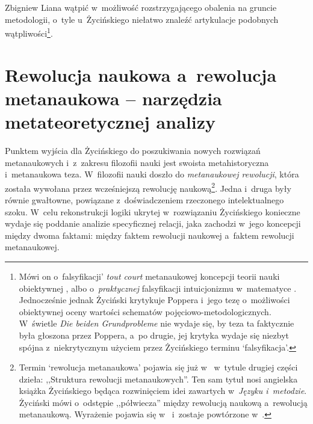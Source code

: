 \begin{artplenv}{Zbigniew Liana}
wątpić w~możliwość rozstrzygającego obalenia na gruncie metodologii, o~tyle u~Życińskiego niełatwo znaleźć artykulacje
podobnych wątpliwości\footnote{\label{lia-foo-12}Mówi on o~falsyfikacji' \textit{tout court} metanaukowej koncepcji teorii nauki
obiektywnej
\parencites[s.~9]{zycinski_structure_1988}[s.~17]{zycinski_struktura_2013},
albo o~\textit{praktycznej} falsyfikacji
intuicjonizmu w~matematyce
\parencites[s.~97]{zycinski_structure_1988}[s.~174]{zycinski_struktura_2013}.
Jednocześnie jednak Życiński
\parencites*[s.~140]{zycinski_structure_1988}[s.~248]{zycinski_struktura_2013}
krytykuje Poppera i~jego tezę o~możliwości obiektywnej
oceny wartości schematów pojęciowo-metodologicznych. W~świetle \textit{Die beiden Grundprobleme} nie wydaje się, by teza
ta faktycznie była głoszona przez Poppera, a~po drugie, jej krytyka wydaje się niezbyt spójna z~niekrytycznym użyciem
przez Życińskiego terminu `falsyfikacja'.}.

\section{Rewolucja naukowa a~rewolucja metanaukowa -- narzędzia metateoretycznej analizy}

Punktem wyjścia dla Życińskiego do poszukiwania nowych rozwiązań metanaukowych i~z~zakresu filozofii nauki jest swoista
metahistoryczna i~metanaukowa teza. W~filozofii nauki doszło do \textit{metanaukowej rewolucji}, która została wywołana
przez wcześniejszą rewolucję naukową\footnote{Termin `rewolucja metanaukowa' pojawia się już
w~\parencite[s.~99]{zycinski_jezyk_1983}
w~tytule drugiej części dzieła: ,,Struktura rewolucji
metanaukowych''. Ten sam tytuł nosi angielska książka Życińskiego
\parencite*{zycinski_structure_1988}
będąca rozwinięciem
idei zawartych w~\textit{Języku i~metodzie}. Życiński mówi o~odstępie ,,półwiecza'' między rewolucją naukową a~rewolucją
metanaukową. Wyrażenie pojawia się
w~\parencite[s.~101]{zycinski_jezyk_1983}
i~zostaje powtórzone w~\parencite[s.~126]{zycinski_elementy_1996}.
}.
Jedna i~druga były
równie gwałtowne, powiązane z~doświadczeniem rzeczonego intelektualnego szoku. W~celu rekonstrukcji logiki ukrytej w~rozwiązaniu
Życińskiego konieczne wydaje się poddanie analizie specyficznej relacji, jaka zachodzi w~jego koncepcji
między dwoma faktami: między faktem rewolucji naukowej a~faktem rewolucji metanaukowej.


\end{artplenv}
